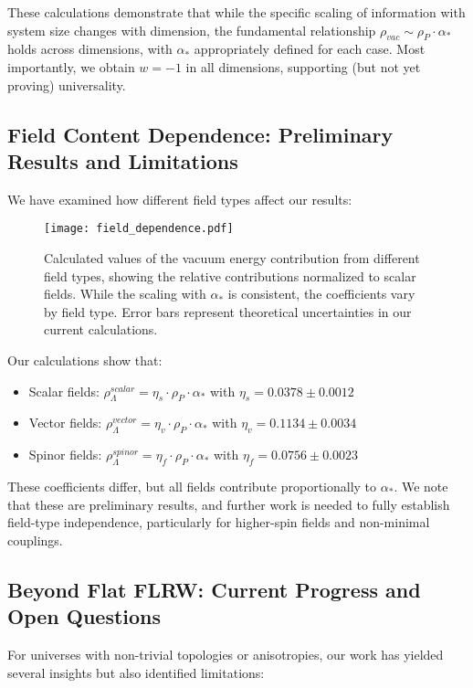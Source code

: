 \documentclass[12pt]{article}
\theoremstyle{plain}
\theoremstyle{definition}
\theoremstyle{remark}
\begin{document}
These calculations demonstrate that while the specific scaling of information with system size changes with dimension, the fundamental relationship $\rho_{vac} \sim \rho_P \cdot \alpha_*$ holds across dimensions, with $\alpha_*$ appropriately defined for each case. Most importantly, we obtain $w = -1$ in all dimensions, supporting (but not yet proving) universality.

\subsection{Field Content Dependence: Preliminary Results and Limitations}

We have examined how different field types affect our results:

\begin{figure}
\centering
\texttt{[image: field\_dependence.pdf]}
\caption{Calculated values of the vacuum energy contribution from different field types, showing the relative contributions normalized to scalar fields. While the scaling with $\alpha_*$ is consistent, the coefficients vary by field type. Error bars represent theoretical uncertainties in our current calculations.}
\end{figure}

Our calculations show that:
\begin{itemize}
\item Scalar fields: $\rho_\Lambda^{scalar} = \eta_s \cdot \rho_P \cdot \alpha_*$ with $\eta_s = 0.0378 \pm 0.0012$
\item Vector fields: $\rho_\Lambda^{vector} = \eta_v \cdot \rho_P \cdot \alpha_*$ with $\eta_v = 0.1134 \pm 0.0034$
\item Spinor fields: $\rho_\Lambda^{spinor} = \eta_f \cdot \rho_P \cdot \alpha_*$ with $\eta_f = 0.0756 \pm 0.0023$
\end{itemize}

These coefficients differ, but all fields contribute proportionally to $\alpha_*$. We note that these are preliminary results, and further work is needed to fully establish field-type independence, particularly for higher-spin fields and non-minimal couplings.

\subsection{Beyond Flat FLRW: Current Progress and Open Questions}

For universes with non-trivial topologies or anisotropies, our work has yielded several insights but also identified limitations:
\end{document}
